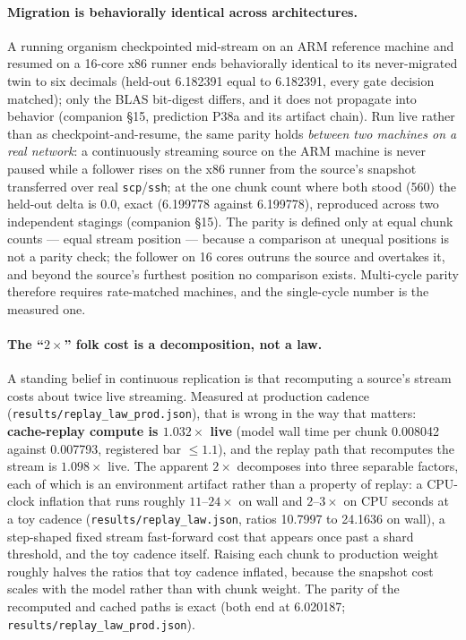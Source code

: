 \documentclass[11pt]{article}
\theoremstyle{definition}
\newcommand{\code}[1]{\texttt{#1}}
\begin{document}
\paragraph{Migration is behaviorally identical across architectures.} A running
organism checkpointed mid-stream on an ARM reference machine and resumed on a
16-core x86 runner ends behaviorally identical to its never-migrated twin to
six decimals (held-out \num{6.182391} equal to \num{6.182391}, every gate
decision matched); only the BLAS bit-digest differs, and it does not propagate
into behavior (companion \S15, prediction P38a and its artifact chain). Run
live rather than as checkpoint-and-resume, the same parity holds \emph{between
two machines on a real network}: a continuously streaming source on the ARM
machine is never paused while a follower rises on the x86 runner from the
source's snapshot transferred over real \code{scp}/\code{ssh}; at the one chunk
count where both stood (560) the held-out delta is \num{0.0}, exact
(\num{6.199778} against \num{6.199778}), reproduced across two independent
stagings (companion \S15). The parity is defined only at equal chunk counts ---
equal stream position --- because a comparison at unequal positions is not a
parity check; the follower on 16 cores outruns the source and overtakes it,
and beyond the source's furthest position no comparison exists. Multi-cycle
parity therefore requires rate-matched machines, and the single-cycle number is
the measured one.

\paragraph{The ``$2\times$'' folk cost is a decomposition, not a law.} A
standing belief in continuous replication is that recomputing a source's stream
costs about twice live streaming. Measured at production cadence
(\code{results/replay\_law\_prod.json}), that is wrong in the way that matters:
\textbf{cache-replay compute is $1.032\times$ live} (model wall time per chunk
\num{0.008042} against \num{0.007793}, registered bar $\le 1.1$), and the
replay path that recomputes the stream is $1.098\times$ live. The apparent
$2\times$ decomposes into three separable factors, each of which is an
environment artifact rather than a property of replay: a CPU-clock inflation
that runs roughly $11$--$24\times$ on wall and $2$--$3\times$ on CPU seconds at
a toy cadence (\code{results/replay\_law.json}, ratios \num{10.7997} to
\num{24.1636} on wall), a step-shaped fixed stream fast-forward cost that
appears once past a shard threshold, and the toy cadence itself. Raising each
chunk to production weight roughly halves the ratios that toy cadence inflated,
because the snapshot cost scales with the model rather than with chunk weight.
The parity of the recomputed and cached paths is exact (both end at
\num{6.020187}; \code{results/replay\_law\_prod.json}).
\end{document}
